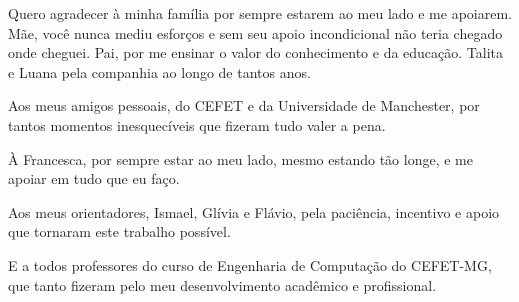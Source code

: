 
\begin{agradecimentos}

Quero agradecer à minha família por sempre estarem ao meu lado e me apoiarem. Mãe, você
nunca mediu esforços e sem seu apoio incondicional não teria chegado onde cheguei. 
Pai, por me ensinar o valor do conhecimento e da educação. Talita e Luana pela companhia ao 
longo de tantos anos.

Aos meus amigos pessoais, do CEFET e da Universidade de Manchester, por tantos momentos 
inesquecíveis que fizeram tudo valer a pena.

À Francesca, por sempre estar ao meu lado, mesmo estando tão longe, e me apoiar em 
tudo que eu faço.

Aos meus orientadores, Ismael, Glívia e Flávio, pela paciência, incentivo e apoio que tornaram 
este trabalho possível.

E a todos professores do curso de Engenharia de Computação do CEFET-MG, que tanto fizeram
pelo meu desenvolvimento acadêmico e profissional.

\end{agradecimentos}
